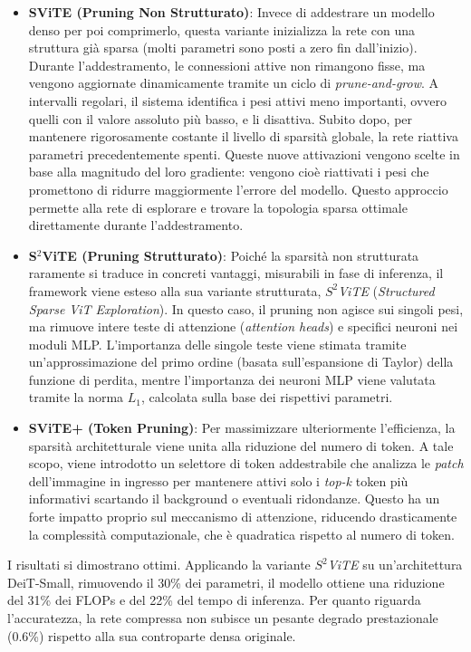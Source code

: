 \begin{itemize}
    \item \textbf{SViTE (Pruning Non Strutturato)}: Invece di addestrare un modello denso per poi comprimerlo, questa variante inizializza la rete con una struttura già sparsa (molti parametri sono posti a zero fin dall'inizio). Durante l'addestramento, le connessioni attive non rimangono fisse, ma vengono aggiornate dinamicamente tramite un ciclo di \textit{prune-and-grow}. A intervalli regolari, il sistema identifica i pesi attivi meno importanti, ovvero quelli con il valore assoluto più basso, e li disattiva. Subito dopo, per mantenere rigorosamente costante il livello di sparsità globale, la rete riattiva parametri precedentemente spenti. Queste nuove attivazioni vengono scelte in base alla magnitudo del loro gradiente: vengono cioè riattivati i pesi che promettono di ridurre maggiormente l'errore del modello. Questo approccio permette alla rete di esplorare e trovare la topologia sparsa ottimale direttamente durante l'addestramento.

    \item \textbf{S$^2$ViTE (Pruning Strutturato)}: Poiché la sparsità non strutturata raramente si traduce in concreti vantaggi, misurabili in fase di inferenza, il framework viene esteso alla sua variante strutturata, \textit{$S^2$ViTE} (\textit{Structured Sparse ViT Exploration}). In questo caso, il pruning non agisce sui singoli pesi, ma rimuove intere teste di attenzione (\textit{attention heads}) e specifici neuroni nei moduli MLP. L'importanza delle singole teste viene stimata tramite un'approssimazione del primo ordine (basata sull'espansione di Taylor) della funzione di perdita, mentre l'importanza dei neuroni MLP viene valutata tramite la norma $L_1$, calcolata sulla base dei rispettivi parametri.

    \item \textbf{SViTE+ (Token Pruning)}: Per massimizzare ulteriormente l'efficienza, la sparsità architetturale viene unita alla riduzione del numero di token. A tale scopo, viene introdotto un selettore di token addestrabile che analizza le \textit{patch} dell'immagine in ingresso per mantenere attivi solo i \textit{top-k} token più informativi scartando il background o eventuali ridondanze. Questo ha un forte impatto proprio sul meccanismo di attenzione, riducendo drasticamente la complessità computazionale, che è quadratica rispetto al numero di token.
\end{itemize}

I risultati si dimostrano ottimi. Applicando la variante \textit{$S^2$ViTE} su
un'architettura DeiT-Small, rimuovendo il 30\% dei parametri, il modello
ottiene una riduzione del 31\% dei FLOPs e del 22\% del tempo di inferenza. Per
quanto riguarda l'accuratezza, la rete compressa non subisce un pesante degrado
prestazionale (0.6\%) rispetto alla sua controparte densa originale.

